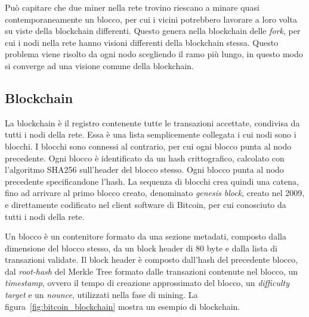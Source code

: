 Può capitare che due miner nella rete trovino riescano a minare quasi contemporaneamente un blocco, per cui i vicini potrebbero lavorare a loro volta su viste della blockchain differenti. Questo genera nella blockchain delle \emph{fork}, per cui i nodi nella rete hanno visioni differenti della blockchain stessa. Questo problema viene risolto da ogni nodo scegliendo il ramo più lungo, in questo modo si converge ad una visione comune della blockchain.


\subsection{Blockchain}\label{sec:blockchain}

La blockchain è il registro contenente tutte le transazioni accettate, condivisa da tutti i nodi della rete. Essa è una lista semplicemente collegata i cui nodi sono i blocchi. I blocchi sono connessi al contrario, per cui ogni blocco punta al nodo precedente. Ogni blocco è identificato da un hash crittografico, calcolato con l'algoritmo SHA256 sull'header del blocco stesso. Ogni blocco punta al nodo precedente specificandone l'hash. La sequenza di blocchi crea quindi una catena, fino ad arrivare al primo blocco creato, denominato \emph{genesis block}, creato nel 2009, e direttamente codificato nel client software di Bitcoin, per cui conosciuto da tutti i nodi della rete.

Un blocco è un contenitore formato da una sezione metadati, composto dalla dimensione del blocco stesso, da un block header di 80 byte e dalla lista di transazioni validate. Il block header è composto dall'hash del precedente blocco, dal \emph{root-hash} del Merkle Tree formato dalle transazioni contenute nel blocco, un \emph{timestamp}, ovvero il tempo di creazione approssimato del blocco, un \emph{difficulty target} e un \emph{nounce}, utilizzati nella fase di mining.
La figura~\ref{fig:bitcoin_blockchain} mostra un esempio di blockchain.

